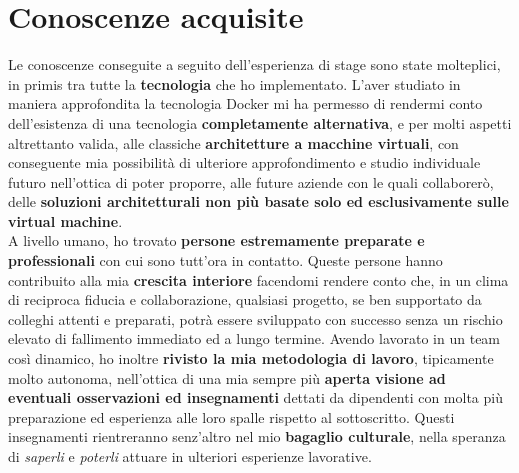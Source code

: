 \section{Conoscenze acquisite}
Le conoscenze conseguite a seguito dell'esperienza di stage sono state molteplici, in primis tra tutte la \textbf{tecnologia} che ho implementato. L'aver studiato in maniera approfondita la tecnologia Docker mi ha permesso di rendermi conto dell'esistenza di una tecnologia\textbf{ completamente alternativa}, e per molti aspetti altrettanto valida, alle classiche \textbf{architetture a macchine virtuali}, con conseguente mia possibilità di ulteriore approfondimento e studio individuale futuro nell'ottica di poter proporre, alle future aziende con le quali collaborerò, delle \textbf{soluzioni architetturali non più basate solo ed esclusivamente sulle virtual machine}.\\
A livello umano, ho trovato \textbf{persone estremamente preparate e professionali} con cui sono tutt'ora in contatto. Queste persone hanno contribuito alla mia \textbf{crescita interiore} facendomi rendere conto che, in un clima di reciproca fiducia e collaborazione, qualsiasi progetto, se ben supportato da colleghi attenti e preparati, potrà essere sviluppato con successo senza un rischio elevato di fallimento immediato ed a lungo termine. Avendo lavorato in un team così dinamico, ho inoltre \textbf{rivisto la mia metodologia di lavoro}, tipicamente molto autonoma, nell'ottica di una mia sempre più \textbf{aperta visione ad eventuali osservazioni ed insegnamenti} dettati da dipendenti con molta più preparazione ed esperienza alle loro spalle rispetto al sottoscritto. Questi insegnamenti rientreranno senz'altro nel mio \textbf{bagaglio culturale}, nella speranza di \textit{saperli} e \textit{poterli} attuare in ulteriori esperienze lavorative.

